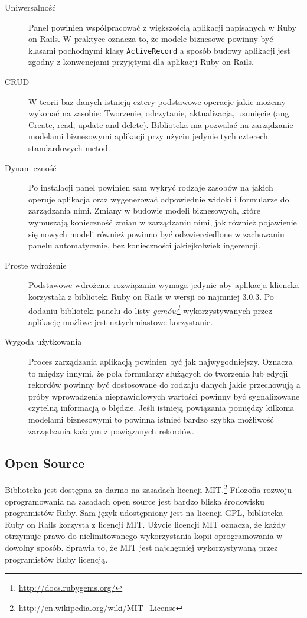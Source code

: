   \begin{description}
    \item[Uniwersalność] Panel powinien współpracować z większością aplikacji napisanych w Ruby on Rails. W praktyce oznacza to, że modele biznesowe powinny być klasami pochodnymi klasy \texttt{ActiveRecord} a sposób budowy aplikacji jest zgodny z konwencjami przyjętymi dla aplikacji Ruby on Rails.
    \item[CRUD] W teorii baz danych istnieją cztery podstawowe operacje jakie możemy wykonać na zasobie: Tworzenie, odczytanie, aktualizacja, usunięcie (ang. Create, read, update and delete). Biblioteka ma pozwalać na zarządzanie modelami biznesowymi aplikacji przy użyciu jedynie tych czterech standardowych metod.
    \item[Dynamiczność] Po instalacji panel powinien sam wykryć rodzaje zasobów na jakich operuje aplikacja oraz wygenerować odpowiednie widoki i formularze do zarządzania nimi. Zmiany w budowie modeli biznesowych, które wymuszają konieczność zmian w zarządzaniu nimi, jak również pojawienie się nowych modeli również powinno być odzwierciedlone w zachowaniu panelu automatycznie, bez konieczności jakiejkolwiek ingerencji.
    \item[Proste wdrożenie] Podstawowe wdrożenie rozwiązania wymaga jedynie aby aplikacja kliencka korzystała z biblioteki Ruby on Rails w wersji co najmniej 3.0.3. Po dodaniu biblioteki panelu do listy \emph{gemów\footnote{\url{http://docs.rubygems.org/}}} wykorzystywanych przez aplikację możliwe jest natychmiastowe korzystanie.
    \item[Wygoda użytkowania] Proces zarządzania aplikacją powinien być jak najwygodniejszy. Oznacza to między innymi, że pola formularzy służących do tworzenia lub edycji rekordów powinny być dostosowane do rodzaju danych jakie przechowują a próby wprowadzenia nieprawidłowych wartości powinny być sygnalizowane czytelną informacją o błędzie. Jeśli istnieją powiązania pomiędzy kilkoma modelami biznesowymi to powinna istnieć bardzo szybka możliwość zarządzania każdym z powiązanych rekordów.
  \end{description}
  
  \subsection{Open Source}
    Biblioteka jest dostępna za darmo na zasadach licencji MIT.\footnote{\url{http://en.wikipedia.org/wiki/MIT_License}} Filozofia rozwoju oprogramowania na zasadach open source jest bardzo bliska środowisku programistów Ruby. Sam język udostępniony jest na licencji GPL, biblioteka Ruby on Rails korzysta z licencji MIT. Użycie licencji MIT oznacza, że każdy otrzymuje prawo do nielimitowanego wykorzystania kopii oprogramowania w dowolny sposób. Sprawia to, że MIT jest  najchętniej wykorzystywaną przez programistów Ruby licencją.
    
